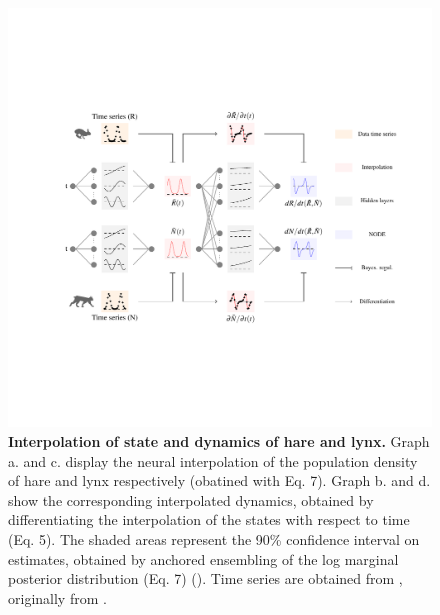 \documentclass[11pt, oneside]{article}
\begin{document}
\begin{figure}[H]
\includegraphics[width=1\linewidth,page=16]{figures/main.pdf}
\caption{
    \textbf{Interpolation of state and dynamics of hare and lynx.}
    Graph a. and c. display the neural interpolation of the population density of hare and lynx respectively (obatined with Eq. 7). 
    Graph b. and d. show the corresponding interpolated dynamics, obtained by differentiating the interpolation of the states with respect to time (Eq. 5).
    The shaded areas represent the 90\% confidence interval on estimates, obtained by anchored ensembling of the log marginal posterior distribution (Eq. 7) (\cite{Pearce2018}).
    Time series are obtained from \cite{Bonnaffe2021a}, originally from \cite{Odum1972}.
}
\end{figure}
\newpage
\end{document}
